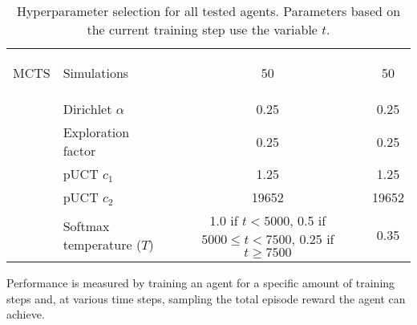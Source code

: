 \begin{table}[ht]
\begin{tabular}{|c|l||c|c|}
        \multirow{7.5}{*}{\begin{sideways}MCTS\end{sideways}} & Simulations & 50 & 50 \\
        \cline{2-4}
        & Dirichlet $\alpha$ & 0.25 & 0.25 \\
        \cline{2-4}
        & Exploration factor & 0.25 & 0.25 \\
        \cline{2-4}
        & pUCT $c_1$ & 1.25 & 1.25 \\
        \cline{2-4}
        & pUCT $c_2$ & 19652 & 19652 \\
        \cline{2-4}
        & Softmax temperature ($T$) & \makecell{
            1.0 if $t<5000$, \\ 0.5 if $5000 \leq t < 7500$, \\ 0.25 if $t \geq 7500$
        } & 0.35 \\

        \hline
    \end{tabular}
    \caption{Hyperparameter selection for all tested agents. Parameters based on the current training step use the variable $t$.}
    \label{tab:hyperparameters}
\end{table}

 Performance is measured by training an agent for a specific amount of training steps and, at various time steps, sampling the total episode reward the agent can achieve.
